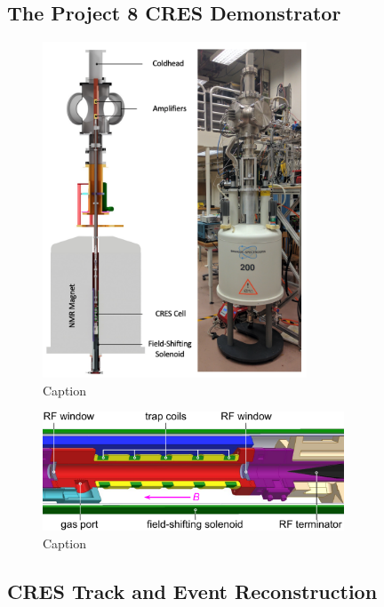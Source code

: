 \subsection{The Project 8 CRES Demonstrator}

\begin{figure}[htbp]
    \centering
    \includegraphics[width=0.7\textwidth]{figs/Chapter-3/phaseII_system.png}
    \caption{Caption}
    \label{fig:phase2_apparatus}
\end{figure}

\begin{figure}[htbp]
    \centering
    \includegraphics[width=0.8\textwidth]{figs/Chapter-3/apparatus.pdf}
    \caption{Caption}
    \label{fig:phase2_cres_cell}
\end{figure}

\subsection{CRES Track and Event Reconstruction}

